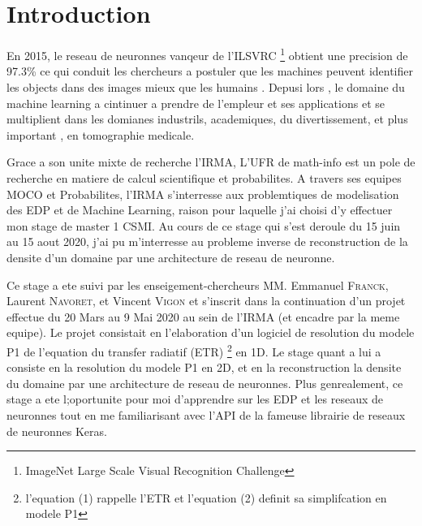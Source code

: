
\chapter{Introduction} %

\label{Chapter1} %


\newcommand{\keyword}[1]{\textbf{#1}}
\newcommand{\tabhead}[1]{\textbf{#1}}
\newcommand{\code}[1]{\texttt{#1}}
\newcommand{\file}[1]{\texttt{\bfseries#1}}
\newcommand{\option}[1]{\texttt{\itshape#1}}


En 2015, le reseau de neuronnes vanqeur de l'ILSVRC \footnote{ImageNet Large Scale Visual Recognition Challenge} obtient une precision de 97.3\% ce qui conduit les chercheurs a postuler que les machines peuvent identifier les objects dans des images mieux que les humains \parencite{Reference1}. Depusi lors , le domaine du machine learning a cintinuer a prendre de l'empleur et ses applications et se multiplient dans les domianes industrils, academiques, du divertissement, et plus important , en tomographie medicale.

Grace a son unite mixte de recherche l'IRMA, L'UFR de math-info est un pole de recherche en matiere de calcul scientifique et probabilites.  A travers ses equipes MOCO et Probabilites, l'IRMA s'interresse aux problemtiques de modelisation des EDP et de Machine Learning, raison pour laquelle j'ai choisi d'y effectuer mon stage de master 1 CSMI. Au cours de ce stage qui s'est deroule du 15 juin au 15 aout 2020, j'ai pu m'interresse au probleme inverse de reconstruction de la densite d'un domaine par une architecture de reseau de neuronne.

Ce stage a ete suivi par les enseigement-chercheurs MM. Emmanuel \textsc{Franck}, Laurent \textsc{Navoret}, et Vincent \textsc{Vigon} et s'inscrit dans la continuation d'un projet effectue du 20 Mars au 9 Mai 2020 au sein de l'IRMA (et encadre par la meme equipe). Le projet consistait en l'elaboration d'un logiciel de resolution du modele P1 de l'equation du transfer radiatif (ETR) \footnote{l'equation (1) rappelle l'ETR et l'equation (2) definit sa simplifcation en modele P1} en 1D. Le stage quant a lui a consiste en la resolution du modele P1 en 2D, et en la reconstruction la densite du domaine par une architecture de reseau de neuronnes. Plus genrealement, ce stage a ete l;oportunite pour moi d'apprendre sur les EDP et les reseaux de neuronnes tout en me familiarisant avec l'API de la fameuse librairie de reseaux de neuronnes Keras. 

